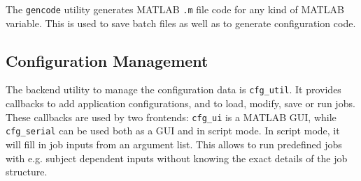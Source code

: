 The \verb|gencode| utility generates MATLAB \verb|.m| file code for any kind
of MATLAB variable. This is used to save batch files as well as to generate
configuration code.

\subsection{Configuration Management}

The backend utility to manage the configuration data is \verb|cfg_util|. It
provides callbacks to add application configurations, and to load, modify,
save or run jobs. These callbacks are used by two frontends: \verb|cfg_ui| is
a MATLAB GUI, while \verb|cfg_serial| can be used both as a GUI and in script
mode. In script mode, it will fill in job inputs from an argument list. This
allows to run predefined jobs with e.g. subject dependent inputs without
knowing the exact details of the job structure.
